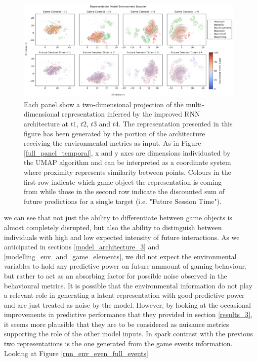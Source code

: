\begin{figure}[ht]
\centering
\includegraphics[width=\textwidth]{images/chapter_4/RNN_env_even_0_lstm_layer_env_Future Session Time.png}
\caption[\textbf{Lower dimensional representation of the latent representations generated by the improved version of the RNN architecture from the environmental metrics}]{Each panel show a two-dimensional projection of the multi-dimensional representation inferred by the improved RNN architecture at $t1$, $t2$, $t3$ and $t4$. The representation presented in this figure has been generated by the portion of the architecture receiving the environmental metrics as input. As in Figure \ref{full_panel_temporal}, x and y axes are dimensions individuated by the UMAP algorithm and can be interpreted as a coordinate system where proximity represents similarity between points. Colours in the first row indicate which game object the representation is coming from while those in the second row indicate the discounted sum of future predictions for a single target (i.e. "Future Session Time").}
\label{rnn_env_even_full_env}
\end{figure}

we can see that not just the ability to differentiate between game objects is almost completely disrupted, but also the ability to distinguish between individuals with high and low expected intensity of future interactions. As we anticipated in sections \ref{model_architecture_3} and \ref{modelling_env_and_game_elements}, we did not expect the environmental variables to hold any predictive power on future ammount of gaming behaviour, but rather to act as an absorbing factor for possible noise observed in the behavioural metrics. It is possible that the environmental information do not play a relevant role in generating a latent representation with good predictive power and are just treated as noise by the model. However, by looking at the occasional improvements in predictive performance that they provided in section \ref{results_3}, it seems more plausible that they are to be considered as nuisance metrics supporting the role of the other model inputs. In spark contrast with the previous two representations is the one generated from the game events information. Looking at Figure \ref{rnn_env_even_full_events} 

